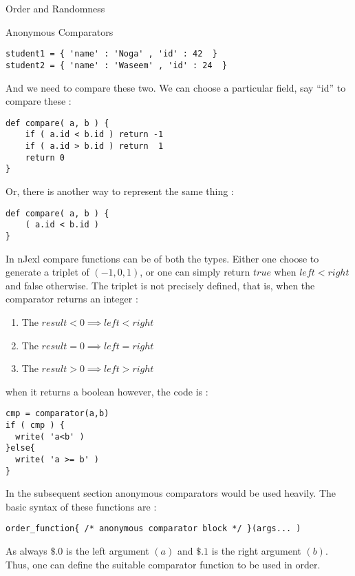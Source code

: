 \begin{section}{Order and Randomness}
\begin{subsection}{Anonymous Comparators}
\begin{lstlisting}[style=JexlStyle]
student1 = { 'name' : 'Noga' , 'id' : 42  }
student2 = { 'name' : 'Waseem' , 'id' : 24  }
\end{lstlisting}  

And we need to compare these two.
We can choose a particular field, say ``id'' to compare these :

\begin{lstlisting}[style=JexlStyle]
def compare( a, b ) {
    if ( a.id < b.id ) return -1 
    if ( a.id > b.id ) return  1
    return 0 
}
\end{lstlisting}  

Or, there is another way to represent the same thing :
 
\begin{lstlisting}[style=JexlStyle]
def compare( a, b ) {
    ( a.id < b.id )
}
\end{lstlisting}  

In nJexl compare functions can be of both the types.
Either one choose to generate a triplet of $( -1, 0, 1 )$,
or one can simply return $true$ when $left < right$ and false
otherwise. The triplet is not precisely defined, 
that is, when the comparator returns an integer :

\begin{enumerate}
\item{ The $ result < 0  \implies left < right $  }
\item{ The $ result = 0  \implies left = right $  }
\item{ The $ result > 0  \implies left > right $  }
\end{enumerate}

when it returns a boolean however, the code is :

\begin{lstlisting}[style=JexlStyle]
cmp = comparator(a,b)
if ( cmp ) {
  write( 'a<b' )
}else{
  write( 'a >= b' )
}
\end{lstlisting}  

In the subsequent section anonymous comparators would be used heavily.
The basic syntax of these functions are :

\begin{lstlisting}[style=JexlStyle]
order_function{ /* anonymous comparator block */ }(args... )
\end{lstlisting}  

As always $\$.0$ is the left argument $(a)$ and $\$.1$ is the right argument $(b)$.
Thus, one can define the suitable comparator function to be used in order.
\end{subsection}



\end{section}
